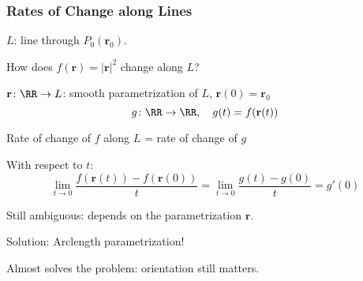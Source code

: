 \begin{frame}
  \frametitle{Rates of Change along Lines}

  $L$: line through $P_0(\textbf{r}_0)$.

  \pause
  \begin{center}
    How does $f(\textbf{r}) = |\textbf{r}|^2$
  change \textcolor[rgb]{0.98,0.00,0.00}{along $L$}?
  \end{center}

  \pause $\textbf{r} \colon \RR \to L$: smooth parametrization of $L$,
  $\textbf{r}(0) = \textbf{r}_0$
  $$g\colon \RR \to \RR, \quad g(t) = f(\textbf{r}(t))$$
  \begin{center}
    Rate of change of $f$ along $L$ = rate of change of $g$
  \end{center}

  \pause With respect to $t$:
  $$\lim_{t\to 0} \frac{f(\textbf{r}(t))-f(\textbf{r}(0))}{t} =
  \lim_{t\to 0} \frac{g(t)-g(0)}{t} = g'(0)$$

  \pause Still ambiguous: \pause depends on the parametrization $\textbf{r}$.\pause

  Solution: \pause Arclength parametrization! \pause

  Almost solves the problem: \pause orientation still matters.
\end{frame}
